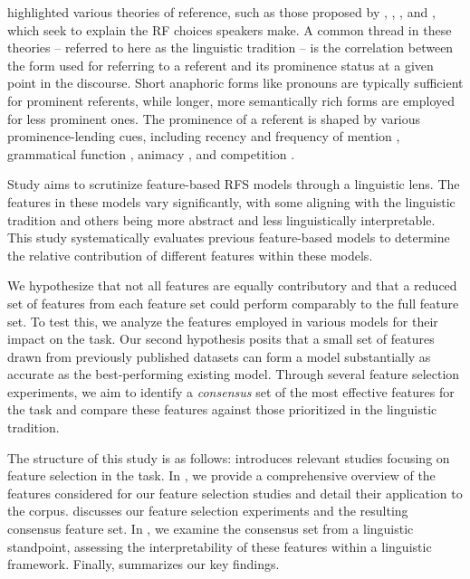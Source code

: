  highlighted various theories of reference, such as those proposed by \citet{gundel1993cognitive}, \citet{ariel2001accessibility}, \citet{grosz1995centering}, and \citet{Heusinger2019}, which seek to explain the RF choices speakers make. A common thread in these theories -- referred to here as the linguistic tradition -- is the correlation between the form used for referring to a referent and its prominence status at a given point in the discourse. Short anaphoric forms like pronouns are typically sufficient for prominent referents, while longer, more semantically rich forms are employed for less prominent ones. The prominence of a referent is shaped by various prominence-lending cues, including recency and frequency of mention \citep{ariel1990accessing}, grammatical function \citep{Brennan1995}, animacy \citep{fukumura2011effect}, and competition \citep{arnold2007effect}.

Study \studB aims to scrutinize feature-based RFS models through a linguistic lens. The features in these models vary significantly, with some aligning with the linguistic tradition and others being more abstract and less linguistically interpretable. This study systematically evaluates previous feature-based \context models to determine the relative contribution of different features within these models. 

We hypothesize that not all features are equally contributory and that a reduced set of features from each feature set could perform comparably to the full feature set. To test this, we analyze the features employed in various \context models for their impact on the task. Our second hypothesis posits that a small set of features drawn from previously published datasets can form a model substantially as accurate as the best-performing existing model. Through several feature selection experiments, we aim to identify a \emph{consensus} set of the most effective features for the \context task and compare these features against those prioritized in the linguistic tradition.

The structure of this study is as follows:  introduces relevant studies focusing on feature selection in the \context task. In , we provide a comprehensive overview of the features considered for our feature selection studies and detail their application to the \wsj corpus.  discusses our feature selection experiments and the resulting consensus feature set. In , we examine the consensus set from a linguistic standpoint, assessing the interpretability of these features within a linguistic framework. Finally,  summarizes our key findings.



